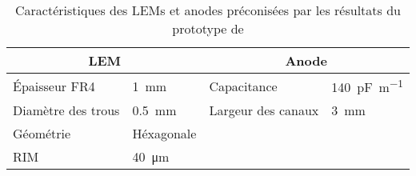       \begin{table}[]
        \centering
        \begin{tabular}{|ll||ll|}
          \hline
          \multicolumn{2}{|c||}{LEM} & \multicolumn{2}{c|}{Anode} \\ \hline \hline
          Épaisseur FR4 & \SI{1}{\milli\meter} & Capacitance & \SI{140}{\pico\farad\per\meter} \\
          Diamètre des trous & \SI{0.5}{\milli\meter} & Largeur des canaux & \SI{3}{\milli\meter} \\
          Géométrie & Héxagonale &  &  \\
          RIM & \SI{40}{\micro\meter} &  &  \\ \hline
        \end{tabular}
        \caption[Caractéristiques des LEMs et anodes utilisé dans le \threeL{}]{\label{tab::lem_anode}Caractéristiques des LEMs et anodes préconisées par les résultats du prototype de \threeL{}}
      \end{table}

